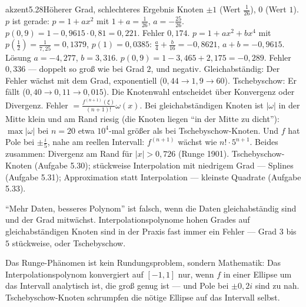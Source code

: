 \begin{loesungkarte}{akzent}{5.28}{Höherer Grad, schlechteres Ergebnis}
Knoten $\pm1$ (Wert $\frac1{26}$), $0$ (Wert $1$). $p$ ist gerade: $p = 1 + ax^{2}$ mit $1 + a = \frac1{26}$, $a = -\frac{25}{26}$. $p(0{,}9) = 1 - 0{,}9615\cdot0{,}81 = 0{,}221$. Fehler $0{,}174$.
$p = 1 + ax^{2} + bx^{4}$ mit $p(\frac12) = \frac1{7{,}25} = 0{,}1379$, $p(1) = 0{,}0385$: $\frac a4 + \frac b{16} = -0{,}8621$, $a + b = -0{,}9615$. Lösung $a = -4{,}277$, $b = 3{,}316$. $p(0{,}9) = 1 - 3{,}465 + 2{,}175 = -0{,}289$. Fehler $0{,}336$ --- doppelt so groß wie bei Grad $2$, und negativ.
Gleichabständig: Der Fehler wächst mit dem Grad, exponentiell ($0{,}44\to1{,}9\to60$). Tschebyschow: Er fällt ($0{,}40\to0{,}11\to0{,}015$). Die Knotenwahl entscheidet über Konvergenz oder Divergenz.
Fehler $= \frac{f^{(n+1)}(\xi)}{(n + 1)!}\omega(x)$. Bei gleichabständigen Knoten ist $|\omega|$ in der Mitte klein und am Rand riesig (die Knoten liegen \enquote{in der Mitte zu dicht}): $\max|\omega|$ bei $n = 20$ etwa $10^{4}$-mal größer als bei Tschebyschow-Knoten. Und $f$ hat Pole bei $\pm\frac i5$, nahe am reellen Intervall: $f^{(n+1)}$ wächst wie $n!\cdot5^{n+1}$. Beides zusammen: Divergenz am Rand für $|x| > 0{,}726$ (Runge 1901).
Tschebyschow-Knoten (Aufgabe 5.30); stückweise Interpolation mit niedrigem Grad --- Splines (Aufgabe 5.31); Approximation statt Interpolation --- kleinste Quadrate (Aufgabe 5.33).
\begin{fehler}\kastentext
\enquote{Mehr Daten, besseres Polynom} ist falsch, wenn die Daten gleichabständig sind und der Grad mitwächst. Interpolationspolynome hohen Grades auf gleichabständigen Knoten sind in der Praxis fast immer ein Fehler --- Grad $3$ bis $5$ stückweise, oder Tschebyschow.
\end{fehler}
\begin{mitnehmen}\kastentext
Das Runge-Phänomen ist kein Rundungsproblem, sondern Mathematik: Das Interpolationspolynom konvergiert auf $[-1, 1]$ nur, wenn $f$ in einer Ellipse um das Intervall analytisch ist, die groß genug ist --- und Pole bei $\pm0{,}2i$ sind zu nah. Tschebyschow-Knoten schrumpfen die nötige Ellipse auf das Intervall selbst.
\end{mitnehmen}
\end{loesungkarte}

